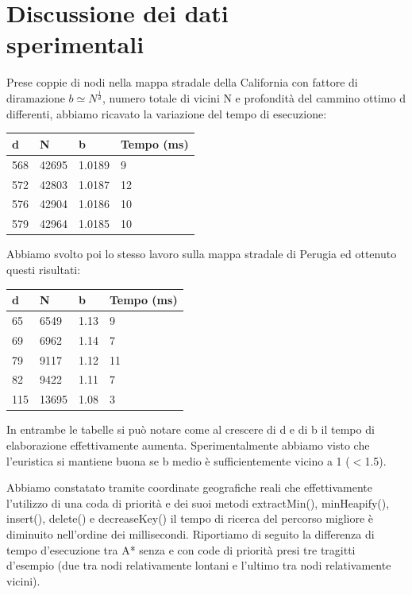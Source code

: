 \documentclass[12pt,a4paper]{report}
\begin{document}
\chapter{Discussione dei dati\\sperimentali}

Prese coppie di nodi nella mappa stradale della California con fattore di diramazione \(b \simeq N^\frac{1}{d}\), numero totale di vicini N e profondità del cammino ottimo d differenti, abbiamo ricavato la variazione del tempo di esecuzione:

\begin{table}[H]
	\centering
	\begin{tabular}{@{}llll@{}}
		\toprule
		\textbf{d} & \textbf{N} & \textbf{b} & \textbf{Tempo (ms)}       \\ \midrule
		568 & 42695 & 1.0189 & 9  \\
		572 & 42803 & 1.0187 & 12 \\
		576 & 42904 & 1.0186 & 10 \\
		579 & 42964 & 1.0185 & 10 \\ \bottomrule
	\end{tabular}
\end{table}

Abbiamo svolto poi lo stesso lavoro sulla mappa stradale di Perugia ed ottenuto questi risultati:

\begin{table}[H]
	\centering
	\begin{tabular}{@{}llll@{}}
		\toprule
		\textbf{d} & \textbf{N} & \textbf{b} & \textbf{Tempo (ms)}       \\ \midrule
		65  & 6549  & 1.13 & 9  \\
		69  & 6962  & 1.14 & 7  \\
		79  & 9117  & 1.12 & 11 \\
		82  & 9422  & 1.11 & 7  \\
		115 & 13695 & 1.08 & 3 \\ \bottomrule
	\end{tabular}
\end{table}

In entrambe le tabelle si può notare come al crescere di d e di b il tempo di elaborazione effettivamente aumenta. Sperimentalmente abbiamo visto che l'euristica si mantiene buona se b medio è sufficientemente vicino a 1 (\(<\)1.5).

Abbiamo constatato tramite coordinate geografiche reali che effettivamente l'utilizzo di una coda di priorità e dei suoi metodi extractMin(), minHeapify(),
\\insert(), delete() e decreaseKey() il tempo di ricerca del percorso migliore è diminuito nell'ordine dei millisecondi.
Riportiamo di seguito la differenza di tempo d'esecuzione tra A* senza e con code di priorità presi tre tragitti d'esempio (due tra nodi relativamente lontani e l'ultimo tra nodi relativamente vicini).
\end{document}
